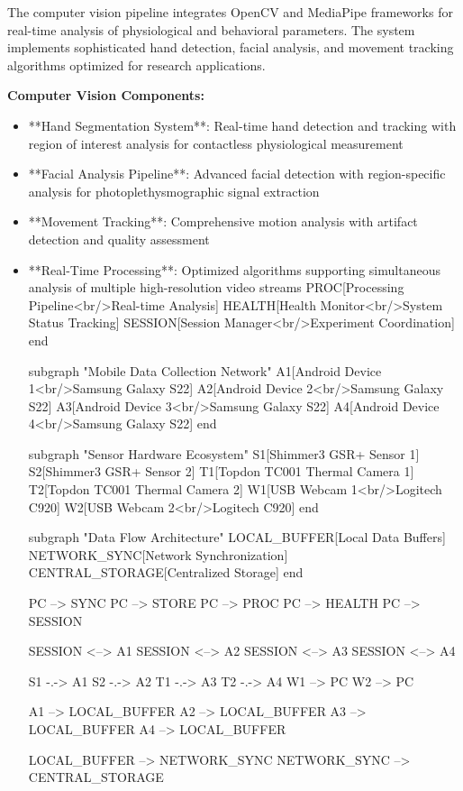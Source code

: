 \documentclass[11pt,a4paper]{report}
\begin{document}
The computer vision pipeline integrates OpenCV and MediaPipe frameworks for real-time analysis of physiological and
behavioral parameters. The system implements sophisticated hand detection, facial analysis, and movement tracking
algorithms optimized for research applications.

\textbf{Computer Vision Components:}

\begin{itemize}
\item **Hand Segmentation System**: Real-time hand detection and tracking with region of interest analysis for contactless
  physiological measurement
\item **Facial Analysis Pipeline**: Advanced facial detection with region-specific analysis for photoplethysmographic signal
  extraction
\item **Movement Tracking**: Comprehensive motion analysis with artifact detection and quality assessment
\item **Real-Time Processing**: Optimized algorithms supporting simultaneous analysis of multiple high-resolution video
  streams
  PROC[Processing Pipeline<br/>Real-time Analysis]
  HEALTH[Health Monitor<br/>System Status Tracking]
  SESSION[Session Manager<br/>Experiment Coordination]
  end

  subgraph "Mobile Data Collection Network"
  A1[Android Device 1<br/>Samsung Galaxy S22]
  A2[Android Device 2<br/>Samsung Galaxy S22]
  A3[Android Device 3<br/>Samsung Galaxy S22]
  A4[Android Device 4<br/>Samsung Galaxy S22]
  end

  subgraph "Sensor Hardware Ecosystem"
  S1[Shimmer3 GSR+ Sensor 1]
  S2[Shimmer3 GSR+ Sensor 2]
  T1[Topdon TC001 Thermal Camera 1]
  T2[Topdon TC001 Thermal Camera 2]
  W1[USB Webcam 1<br/>Logitech C920]
  W2[USB Webcam 2<br/>Logitech C920]
  end

  subgraph "Data Flow Architecture"
  LOCAL\_BUFFER[Local Data Buffers]
  NETWORK\_SYNC[Network Synchronization]
  CENTRAL\_STORAGE[Centralized Storage]
  end

  PC --> SYNC
  PC --> STORE
  PC --> PROC
  PC --> HEALTH
  PC --> SESSION

  SESSION <--> A1
  SESSION <--> A2
  SESSION <--> A3
  SESSION <--> A4

  S1 -.-> A1
  S2 -.-> A2
  T1 -.-> A3
  T2 -.-> A4
  W1 --> PC
  W2 --> PC

  A1 --> LOCAL\_BUFFER
  A2 --> LOCAL\_BUFFER
  A3 --> LOCAL\_BUFFER
  A4 --> LOCAL\_BUFFER

  LOCAL\_BUFFER --> NETWORK\_SYNC
  NETWORK\_SYNC --> CENTRAL\_STORAGE


\end{itemize}
\end{document}
